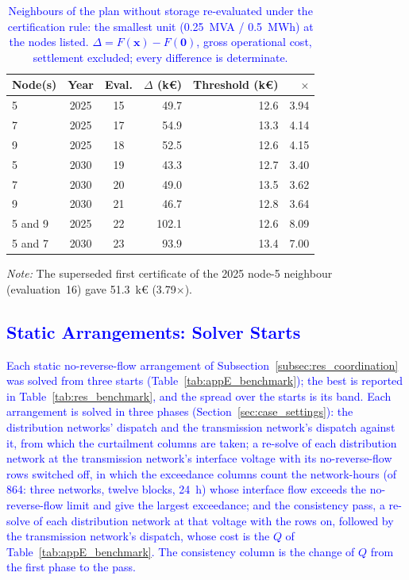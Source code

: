 \documentclass[preprint,12pt]{elsarticle}
\begin{document}
\begin{table}[htbp!]
    \centering
    \caption{\textcolor{blue}{Neighbours of the plan without storage re-evaluated under the certification rule: the smallest unit (0.25~MVA / 0.5~MWh) at the nodes listed. $\Delta = F(\boldsymbol{x}) - F(\boldsymbol{0})$, gross operational cost, settlement excluded; every difference is determinate.}}
    \label{tab:appE_neighbours}
    \scriptsize\setlength{\tabcolsep}{5pt}
    \begin{tabular}{l c c r r r}
        \toprule
        Node(s) & Year & Eval. & $\Delta$ (k\euro) & Threshold (k\euro) & $\times$ \\
        \midrule
        5 & 2025 & 15 & 49.7 & 12.6 & 3.94 \\
        7 & 2025 & 17 & 54.9 & 13.3 & 4.14 \\
        9 & 2025 & 18 & 52.5 & 12.6 & 4.15 \\
        5 & 2030 & 19 & 43.3 & 12.7 & 3.40 \\
        7 & 2030 & 20 & 49.0 & 13.5 & 3.62 \\
        9 & 2030 & 21 & 46.7 & 12.8 & 3.64 \\
        5 and 9 & 2025 & 22 & 102.1 & 12.6 & 8.09 \\
        5 and 7 & 2030 & 23 & 93.9 & 13.4 & 7.00 \\
        \bottomrule
    \end{tabular}
    \par\smallskip
    \begin{minipage}{0.80\linewidth}
        \scriptsize\raggedright
        \textit{Note:} The superseded first certificate of the 2025 node-5 neighbour (evaluation~16) gave 51.3~k\euro{} (3.79$\times$).
    \end{minipage}
\end{table}

\subsection{\textcolor{blue}{Static Arrangements: Solver Starts}}
\label{app:results_benchmark}

\textcolor{blue}{
    Each static no-reverse-flow arrangement of Subsection~\ref{subsec:res_coordination} was solved from three starts (Table~\ref{tab:appE_benchmark}); the best is reported in Table~\ref{tab:res_benchmark}, and the spread over the starts is its band. Each arrangement is solved in three phases (Section~\ref{sec:case_settings}): the distribution networks' dispatch and the transmission network's dispatch against it, from which the curtailment columns are taken; a re-solve of each distribution network at the transmission network's interface voltage with its no-reverse-flow rows switched off, in which the exceedance columns count the network-hours (of 864: three networks, twelve blocks, 24~h) whose interface flow exceeds the no-reverse-flow limit and give the largest exceedance; and the consistency pass, a re-solve of each distribution network at that voltage with the rows on, followed by the transmission network's dispatch, whose cost is the $Q$ of Table~\ref{tab:appE_benchmark}. The consistency column is the change of $Q$ from the first phase to the pass.
}
\end{document}

